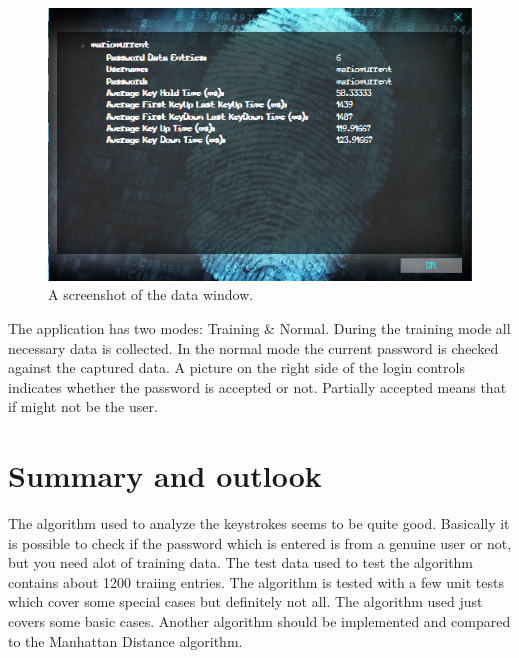 \documentclass[fleqn,10pt]{SelfArx} %
\begin{document}
\begin{figure}[!htb]
\includegraphics[scale=0.6]{viewData}
 \caption{A screenshot of the data window.}
\end{figure}
The application has two modes: Training \& Normal. During the training mode all necessary data is collected. In the normal mode the current password is checked against the captured data. A picture on the right side of the login controls indicates whether the password is accepted or not. Partially accepted means that if might not be the user.

\section{Summary and outlook}
The algorithm used to analyze the keystrokes seems to be quite good. Basically it is possible to check if the password which is entered is from a genuine user or not, but you need alot of training data. The test data used to test the algorithm contains about 1200 traiing entries. The algorithm is tested with a few unit tests which cover some special cases but definitely not all.
\newline
The algorithm used just covers some basic cases. Another algorithm should be implemented and compared to the Manhattan Distance algorithm.




\end{document}
